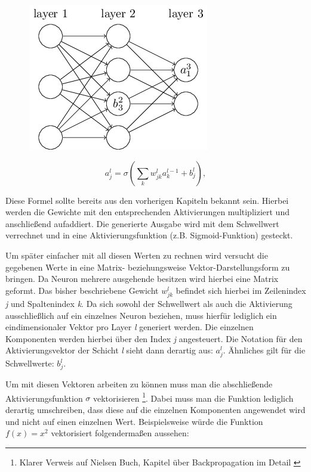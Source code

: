 \begin{figure}[!htb]
	\centering
	\includegraphics[width=.4\linewidth]{img/biasAct_notation}
	\label{fig:biasAct_not}
\end{figure}

\begin{equation} \label{eq:act}
a^{l}_j = \sigma\left( \sum_k w^{l}_{jk} a^{l-1}_k + b^l_j \right),
\end{equation}

Diese Formel sollte bereits aus den vorherigen Kapiteln bekannt sein. Hierbei werden die Gewichte mit den entsprechenden Aktivierungen multipliziert und anschließend aufaddiert. Die generierte Ausgabe wird mit dem Schwellwert verrechnet und in eine Aktivierungsfunktion (z.B. Sigmoid-Funktion) gesteckt.

Um später einfacher mit all diesen Werten zu rechnen wird versucht die gegebenen Werte in eine Matrix- beziehungsweise Vektor-Darstellungsform zu bringen. Da Neuron mehrere ausgehende  besitzen wird hierbei eine Matrix geformt. Das bisher beschriebene Gewicht $w^l_{jk}$ befindet sich hierbei im Zeilenindex \emph{j} und Spaltenindex \emph{k}. Da sich sowohl der Schwellwert als auch die Aktivierung ausschließlich auf ein einzelnes Neuron beziehen, muss hierfür lediglich ein eindimensionaler Vektor pro Layer \emph{l} generiert werden. Die einzelnen Komponenten werden hierbei über den Index \emph{j} angesteuert. Die Notation für den Aktivierungsvektor der Schicht \emph{l} sieht dann derartig aus: $a^l_j$. Ähnliches gilt für die Schwellwerte: $b^l_j$.

Um mit diesen Vektoren arbeiten zu können muss man die abschließende Aktivierungsfunktion $\sigma$ vektorisieren
\footnote{Klarer Verweis auf Nielsen Buch, Kapitel über Backpropagation im Detail \cite{dlnielsen}}.
Dabei muss man die Funktion lediglich derartig umschreiben, dass diese auf die einzelnen Komponenten angewendet wird und nicht auf einen einzelnen Wert. Beispielsweise würde die Funktion $f(x) = x^2$ vektorisiert folgendermaßen aussehen:

